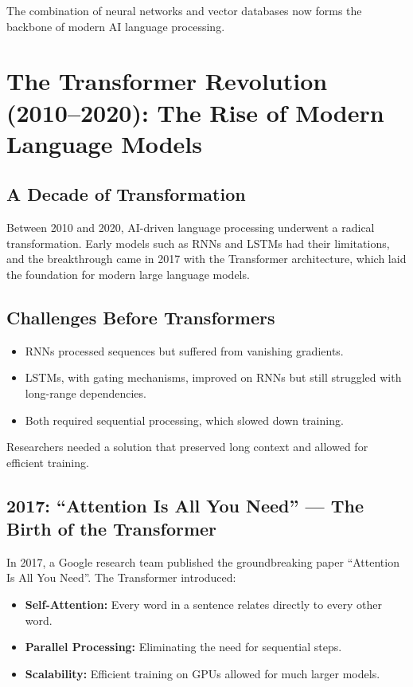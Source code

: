 The combination of neural networks and vector databases now forms the backbone of modern
AI language processing.


\section{The Transformer Revolution (2010--2020): The Rise of Modern Language Models}

\subsection{A Decade of Transformation}

Between 2010 and 2020, AI-driven language processing underwent a radical transformation.
Early models such as RNNs and LSTMs had their limitations, and the breakthrough came in 2017
with the Transformer architecture, which laid the foundation for modern large language models.

\subsection{Challenges Before Transformers}

\begin{itemize}
  \item RNNs processed sequences but suffered from vanishing gradients.
  \item LSTMs, with gating mechanisms, improved on RNNs but still struggled with long-range
        dependencies.
  \item Both required sequential processing, which slowed down training.
\end{itemize}

Researchers needed a solution that preserved long context and allowed for efficient training.

\subsection{2017: ``Attention Is All You Need'' --- The Birth of the Transformer}

In 2017, a Google research team published the groundbreaking paper
``Attention Is All You Need''. The Transformer introduced:
\begin{itemize}
  \item \textbf{Self-Attention:} Every word in a sentence relates directly to every other word.
  \item \textbf{Parallel Processing:} Eliminating the need for sequential steps.
  \item \textbf{Scalability:} Efficient training on GPUs allowed for much larger models.
\end{itemize}

